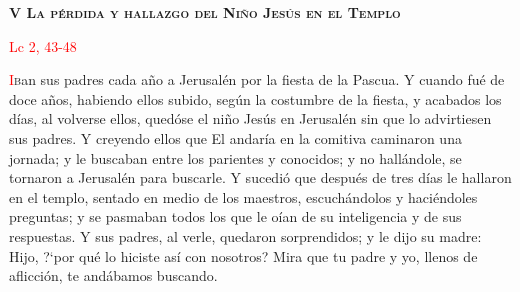 \begin{center}
    \textbf{\textsc{V La pérdida y hallazgo del Niño Jesús en el Templo}}
    
    \textcolor{red}{Lc 2, 43-48}
\end{center}



\vspace{0.25em}

\lettrine[lines=2]{\textcolor{red}{I}}ban sus padres cada año a Jerusalén por la fiesta de la Pascua. Y cuando fué de doce años, habiendo ellos subido, según la costumbre de la fiesta,
y acabados los días, al volverse ellos, quedóse el niño Jesús en Jerusalén sin que lo advirtiesen sus padres. Y creyendo ellos que El andaría en la comitiva caminaron una jornada; y le
buscaban entre los parientes y conocidos; y no hallándole, se tornaron a Jerusalén para buscarle. Y sucedió que después de tres días le hallaron en el templo,
sentado en medio de los maestros, escuchándolos y haciéndoles preguntas; y se pasmaban todos los que le oían de su inteligencia y de sus respuestas.
Y sus padres, al verle, quedaron sorprendidos; y le dijo su madre: Hijo, {?`}por qué lo hiciste así con nosotros? Mira que tu padre y yo, llenos de aflicción, 
te andábamos buscando.